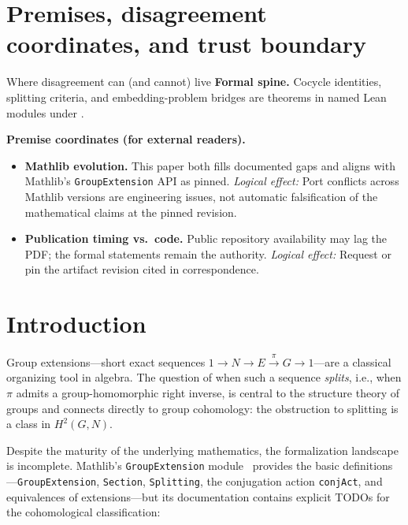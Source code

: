 \documentclass[11pt]{article}
\newcommand{\lean}[1]{\texttt{#1}}
\begin{document}
\section{Premises, disagreement coordinates, and trust boundary}\label{sec:premises-ic-group-ext}
\begin{keybox}{Where disagreement can (and cannot) live}
\textbf{Formal spine.}
Cocycle identities, splitting criteria, and embedding-problem bridges are theorems in named Lean modules under .

\medskip
\textbf{Premise coordinates (for external readers).}
{\raggedright
\begin{itemize}[leftmargin=2em]
\item \textbf{Mathlib evolution.} This paper both fills documented gaps and aligns with Mathlib's \texttt{GroupExtension} API as pinned.
  \emph{Logical effect:} Port conflicts across Mathlib versions are engineering issues, not automatic falsification of the mathematical claims at the pinned revision.
\item \textbf{Publication timing vs.\ code.} Public repository availability may lag the PDF; the formal statements remain the authority.
  \emph{Logical effect:} Request or pin the artifact revision cited in correspondence.
\end{itemize}
\par}
\end{keybox}

\tableofcontents
\newpage

\section{Introduction}\label{sec:intro}

Group extensions---short exact sequences $1 \to N \to E \xrightarrow{\pi} G \to 1$---are
a classical organizing tool in algebra.  The question of when such a sequence
\emph{splits}, i.e., when $\pi$ admits a group-homomorphic right inverse, is central
to the structure theory of groups and connects directly to group cohomology: the
obstruction to splitting is a class in $H^2(G, N)$.

Despite the maturity of the underlying mathematics, the formalization landscape is
incomplete.  Mathlib's \lean{GroupExtension} module~\cite{Mathlib,Yamazaki2024}
provides the basic definitions---\lean{GroupExtension}, \lean{Section},
\lean{Splitting}, the conjugation action \lean{conjAct}, and equivalences of
extensions---but its documentation contains explicit TODOs for the cohomological
classification:
\end{document}
